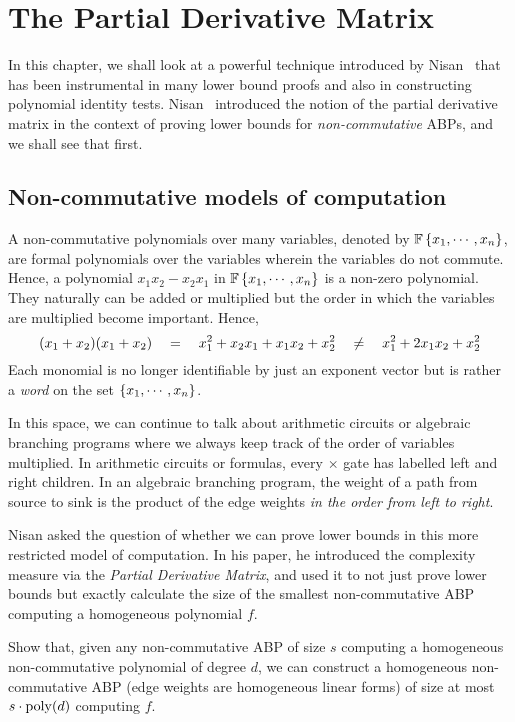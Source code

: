 \chapter{The Partial Derivative Matrix}\label{chap:evalDim}

In this chapter, we shall look at a powerful technique introduced by Nisan~\cite{nis91} that has been instrumental in many lower bound proofs and also in constructing polynomial identity tests.
Nisan~\cite{nis91} introduced the notion of the partial derivative matrix in the context of proving lower bounds for \emph{non-commutative} ABPs, and we shall see that first.

\section{Non-commutative models of computation}

A non-commutative polynomials over many variables, denoted by $\mathbb{F}\left\{x_1,\cdots, x_n\right\}$, are formal polynomials over the variables wherein the variables do not commute. Hence, a polynomial $x_1x_2 - x_2x_1$ in $\mathbb{F}\left\{x_1,\cdots, x_n\right\}$ is a non-zero polynomial. They naturally can be added or multiplied but the order in which the variables are multiplied become important. Hence,
\[
(x_1 + x_2)(x_1 + x_2) \quad = \quad x_1^2 + x_2x_1 + x_1x_2 + x_2^2 \quad \neq \quad x_1^2 + 2x_1x_2 + x_2^2
\]
Each monomial is no longer identifiable by just an exponent vector but is rather a \emph{word} on the set $\left\{x_1,\cdots, x_n\right\}$. 

In this space, we can continue to talk about arithmetic circuits or algebraic branching programs where we always keep track of the order of variables multiplied. In arithmetic circuits or formulas, every $\times$ gate has labelled left and right children. In an algebraic branching program, the weight of a path from source to sink is the product of the edge weights \emph{in the order from left to right}. 

Nisan \cite{nis91} asked the question of whether we can prove lower bounds in this more restricted model of computation. In his paper, he introduced the complexity measure via the \emph{Partial Derivative Matrix}, and used it to not just prove lower bounds but exactly calculate the size of the smallest non-commutative ABP computing a homogeneous polynomial $f$. \\

\begin{exercise}
Show that, given any non-commutative ABP of size $s$ computing a homogeneous non-commutative polynomial of degree $d$, we can construct a homogeneous non-commutative ABP (edge weights are homogeneous linear forms) of size at most $s \cdot \operatorname{poly}(d)$ computing $f$. 
\end{exercise}

